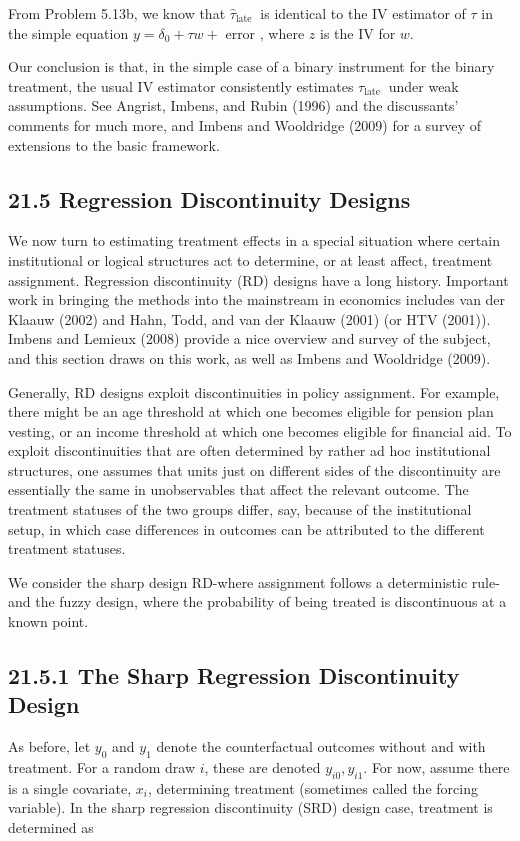 \documentclass[10pt]{article}
\begin{document}
From Problem 5.13b, we know that $\hat{\tau}_{\text {late }}$ is identical to the IV estimator of $\tau$ in the simple equation $y=\delta_{0}+\tau w+$ error , where $z$ is the IV for $w$.

Our conclusion is that, in the simple case of a binary instrument for the binary treatment, the usual IV estimator consistently estimates $\tau_{\text {late }}$ under weak assumptions. See Angrist, Imbens, and Rubin (1996) and the discussants' comments for much more, and Imbens and Wooldridge (2009) for a survey of extensions to the basic framework.

\subsection*{21.5 Regression Discontinuity Designs}
We now turn to estimating treatment effects in a special situation where certain institutional or logical structures act to determine, or at least affect, treatment assignment. Regression discontinuity (RD) designs have a long history. Important work in bringing the methods into the mainstream in economics includes van der Klaauw (2002) and Hahn, Todd, and van der Klaauw (2001) (or HTV (2001)). Imbens and Lemieux (2008) provide a nice overview and survey of the subject, and this section draws on this work, as well as Imbens and Wooldridge (2009).

Generally, RD designs exploit discontinuities in policy assignment. For example, there might be an age threshold at which one becomes eligible for pension plan vesting, or an income threshold at which one becomes eligible for financial aid. To exploit discontinuities that are often determined by rather ad hoc institutional structures, one assumes that units just on different sides of the discontinuity are essentially the same in unobservables that affect the relevant outcome. The treatment statuses of the two groups differ, say, because of the institutional setup, in which case differences in outcomes can be attributed to the different treatment statuses.

We consider the sharp design RD-where assignment follows a deterministic rule-and the fuzzy design, where the probability of being treated is discontinuous at a known point.

\subsection*{21.5.1 The Sharp Regression Discontinuity Design}
As before, let $y_{0}$ and $y_{1}$ denote the counterfactual outcomes without and with treatment. For a random draw $i$, these are denoted $y_{i 0}, y_{i 1}$. For now, assume there is a single covariate, $x_{i}$, determining treatment (sometimes called the forcing variable). In the sharp regression discontinuity (SRD) design case, treatment is determined as
\end{document}
